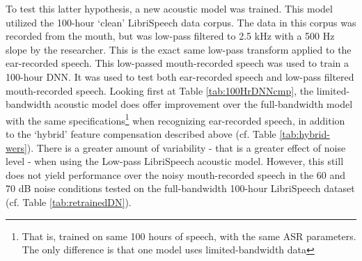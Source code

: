 % 


To test this latter hypothesis, a new acoustic model was trained.  This model utilized the 100-hour `clean' LibriSpeech data corpus.  The data in this corpus was recorded from the mouth, but was low-pass filtered to 2.5 kHz with a 500 Hz slope by the researcher.  This is the exact same low-pass transform applied to the ear-recorded speech.  This low-passed mouth-recorded speech was used to train a 100-hour DNN. It was used to test both ear-recorded speech and low-pass filtered mouth-recorded speech.  Looking first at Table \ref{tab:100HrDNNcmp}, the limited-bandwidth acoustic model does offer improvement over the full-bandwidth model with the same specifications\footnote{That is, trained on same 100 hours of speech, with the same ASR parameters. The only difference is that one model uses limited-bandwidth data} when recognizing ear-recorded speech, in addition to the `hybrid' feature compensation described above (cf. Table \ref{tab:hybrid-wers}).  There is a greater amount of variability - that is a greater effect of noise level - when using the Low-pass LibriSpeech acoustic model.  However, this still does not yield performance over the noisy mouth-recorded speech in the 60 and 70 dB noise conditions tested on the full-bandwidth 100-hour LibriSpeech dataset (cf. Table \ref{tab:retrainedDN}).

